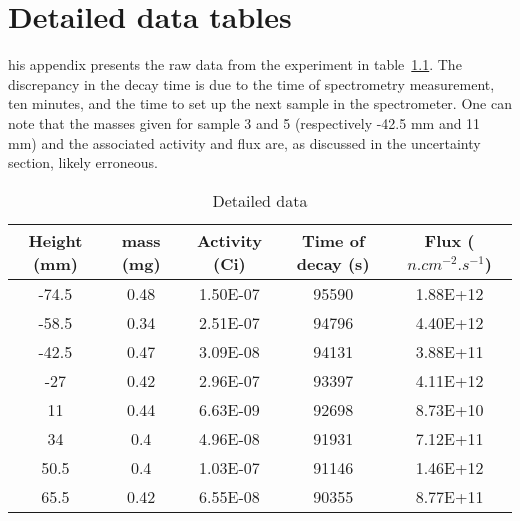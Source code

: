 \chapter{Detailed data tables}
\label{app:app01}

his appendix presents the raw data from the experiment in table~\ref{tab:data}. The discrepancy in the decay time is due to the time of spectrometry measurement, ten minutes, and the time to set up the next sample in the spectrometer. One can note that the masses given for sample 3 and 5 (respectively -42.5 mm and 11 mm) and the associated activity and flux are, as discussed in the uncertainty section, likely erroneous.


\begin{table}[]
\centering
\caption{Detailed data}
\label{tab:data}
\begin{tabular}{|c|c|c|c|c|}
\hline
Height (mm) & mass (mg) & Activity (Ci) & Time of decay (s) & Flux ($n.cm^{-2}.s^{-1}$) \\ \hline
-74.5       & 0.48      & 1.50E-07      & 95590             & 1.88E+12                  \\ \hline
-58.5       & 0.34      & 2.51E-07      & 94796             & 4.40E+12                  \\ \hline
-42.5       & 0.47      & 3.09E-08      & 94131             & 3.88E+11                  \\ \hline
-27         & 0.42      & 2.96E-07      & 93397             & 4.11E+12                  \\ \hline
11          & 0.44      & 6.63E-09      & 92698             & 8.73E+10                  \\ \hline
34          & 0.4       & 4.96E-08      & 91931             & 7.12E+11                  \\ \hline
50.5        & 0.4       & 1.03E-07      & 91146             & 1.46E+12                  \\ \hline
65.5        & 0.42      & 6.55E-08      & 90355             & 8.77E+11                  \\ \hline
\end{tabular}
\end{table}


\
